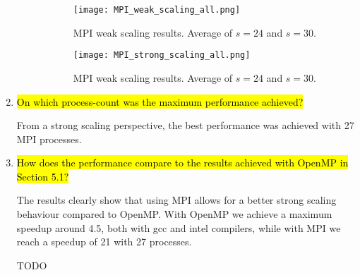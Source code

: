 \documentclass{article}
\begin{document}
\begin{enumerate}
\begin{description}
		\begin{figure}[p] %
		 	\begin{center}
		 		\texttt{[image: MPI\_weak\_scaling\_all.png]} %
		 		\caption{MPI weak scaling results. Average of $s=24$ and $s=30$.}
		 		\label{fig:MPI_weakScaling}
		 	\end{center}
		\end{figure}
		\begin{figure}[p] %
		 	\begin{center}
		 		\texttt{[image: MPI\_strong\_scaling\_all.png]} %
		 		\caption{MPI weak scaling results. Average of $s=24$ and $s=30$.}
		 		\label{fig:MPI_strongScaling}
		 	\end{center}
		\end{figure}
	\end{description}

	\item \hl{On which process-count was the maximum performance achieved?}

	From a strong scaling perspective, the best performance was achieved with 27 MPI processes.

	\item \hl{How does the performance compare to the results achieved with OpenMP in Section 5.1?}

	The results clearly show that using MPI allows for a better strong scaling behaviour compared to OpenMP. With OpenMP we achieve a maximum speedup around 4.5, both with gcc and intel compilers, while with MPI we reach a speedup of 21 with 27 processes.

	TODO
	
	
\end{enumerate}
\end{document}
